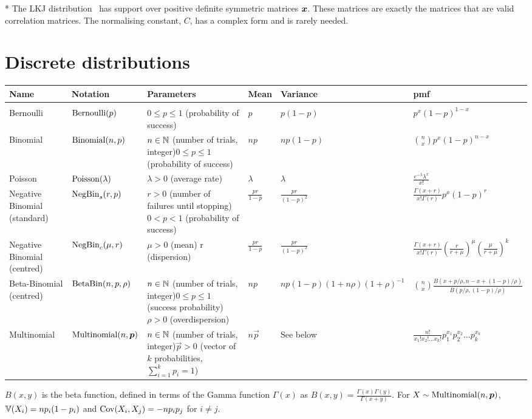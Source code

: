 \documentclass[thesis.tex]{subfiles}
\begin{document}
\begin{landscape}
* The LKJ distribution~\autocite{lewandowskiGenerating} has support over positive definite symmetric matrices $\bm{x}$.
These matrices are exactly the matrices that are valid correlation matrices.
The normalising constant, $C$, has a complex form and is rarely needed.

\section{Discrete distributions}
\begin{tabular}{llp{3.5cm}lll}
Name & Notation & Parameters & Mean & Variance & pmf \\
\hline \\
Bernoulli & $\operatorname{Bernoulli}(p)$ & $0 \leq p \leq 1$ (probability of success) & $p$ & $p(1-p)$ & $p^x(1-p)^{1-x}$ \\
Binomial & $\operatorname{Binomial}(n, p)$ & $n \in \mathbb{N}$ (number of trials, integer)\newline $0 \leq p \leq 1$ (probability of success) & $np$ & $np(1-p)$ & ${n \choose x}p^x(1-p)^{n-x}$ \\
Poisson & $\operatorname{Poisson}(\lambda)$ & $\lambda > 0$ (average rate) & $\lambda$ & $\lambda$ & $\frac{e^{-\lambda}\lambda^x}{x!}$ \\
Negative Binomial (standard) & $\operatorname{NegBin}_{s}(r, p)$ & $r > 0$ (number of failures until stopping)\newline $0 < p < 1$ (probability of success) & $\frac{pr}{1-p}$ & $\frac{pr}{(1-p)^2}$ & $\frac{\Gamma(x+r)}{x! \Gamma(r)} p^x (1-p)^r$ \\
Negative Binomial (centred) & $\operatorname{NegBin}_{c}(\mu, r)$ & $\mu > 0$ (mean) \newline r (dispersion) & $\frac{pr}{1-p}$ & $\frac{pr}{(1-p)^2}$ & $\frac{\Gamma(x+r)}{x! \Gamma(r)} \left( \frac{r}{r+\mu} \right)^\mu \left( \frac{\mu}{r+\mu} \right)^k$ \\
Beta-Binomial (centred) & $\operatorname{BetaBin}(n, p, \rho)$ & $n \in \mathbb{N}$ (number of trials, integer)\newline $0 \leq p \leq 1$ (success probability)\newline $\rho > 0$ (overdispersion) & $np$ & $np(1-p)(1+n\rho)(1+\rho)^{-1}$ & ${n \choose x} \frac{B(x+p/\rho, n-x+(1-p)/\rho)}{B(p/\rho, (1-p)/\rho)}$ \\
Multinomial & $\operatorname{Multinomial}(n, \bm{p})$ & $n \in \mathbb{N}$ (number of trials, integer)\newline $\vec{p} > 0$ (vector of $k$ probabilities, $\sum_{i=1}^k p_i = 1$) & $n \vec{p}$ & See below & $\frac{n!}{x_1!x_2!\ldots x_k!}p_1^{x_1}p_2^{x_2}\ldots p_k^{x_k}$ \\
\end{tabular}

$B(x,y)$ is the beta function, defined in terms of the Gamma function $\Gamma(x)$ as $B(x,y) = \frac{\Gamma(x)\Gamma(y)}{\Gamma(x+y)}$.
For $X \sim \operatorname{Multinomial}(n, \bm{p})$, $\operatorname{\mathbb{V}}(X_i) = np_i(1-p_i)$ and $\operatorname{Cov}(X_i, X_j) = -np_ip_j$ for $i \neq j$.
\end{landscape}
\end{document}
